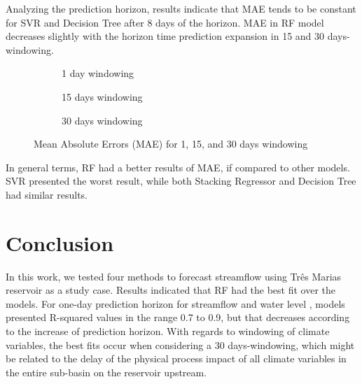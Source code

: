 \documentclass[12pt]{article}
\begin{document}
Analyzing the prediction horizon, results indicate that MAE tends to be constant for SVR and Decision Tree after 8 days of the horizon. MAE in RF model decreases slightly with the horizon time prediction expansion in 15 and 30 days-windowing.

\begin{figure}[htbp]
    \centering
    \begin{subfigure}[b]{.49\textwidth}
        \centering
        
        \caption{1 day windowing}
        \label{fig:sfig1MAE}
    \end{subfigure}
    \begin{subfigure}[b]{.49\textwidth}
        \centering
        
        \caption{15 days windowing}
        \label{fig:sfig2MAE}
    \end{subfigure}
    \begin{subfigure}[b]{\textwidth}
        \centering
        
        \captionsetup{justification=justified,singlelinecheck=false}
        \caption{30 days windowing}
        \label{fig:sfig3MAE}
    \end{subfigure}
    \caption{Mean Absolute Errors (MAE) for  1,  15, and  30 days windowing}
    \label{fig:sfigMAE}
\end{figure}

In general terms, RF had a better results of MAE, if compared to other models. SVR presented the worst result, while both Stacking Regressor and Decision Tree had similar results.

\section{Conclusion}

In this work, we tested four methods to forecast streamflow using Três Marias reservoir as a study case. Results indicated that RF had the best fit over the models.  For one-day prediction horizon for streamflow and water level , models presented R-squared values in the range 0.7 to 0.9, but that decreases according to the increase of  prediction horizon. With regards to windowing of climate variables, the best fits occur when considering a 30 days-windowing, which might be related to the delay of the physical process impact of all climate variables in the entire sub-basin on the reservoir upstream.
\end{document}
